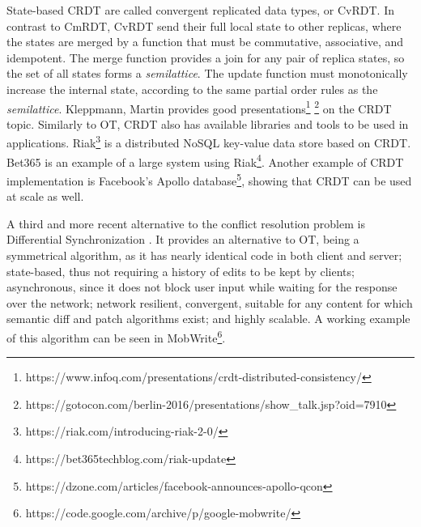 State-based CRDT are called convergent replicated data types, or CvRDT. In contrast to CmRDT, CvRDT send their full local state to other replicas, where the states are merged by a function that must be commutative, associative, and idempotent. The merge function provides a join for any pair of replica states, so the set of all states forms a \textit{semilattice}. The update function must monotonically increase the internal state, according to the same partial order rules as the \textit{semilattice}. Kleppmann, Martin provides good presentations\footnote{https://www.infoq.com/presentations/crdt-distributed-consistency/} \footnote{https://gotocon.com/berlin-2016/presentations/show\_talk.jsp?oid=7910} on the CRDT topic. Similarly to OT, CRDT also has available libraries and tools to be used in applications. Riak\footnote{https://riak.com/introducing-riak-2-0/} is a distributed NoSQL key-value data store based on CRDT. Bet365 is an example of a large system using Riak\footnote{https://bet365techblog.com/riak-update}. Another example of CRDT implementation is Facebook's Apollo database\footnote{https://dzone.com/articles/facebook-announces-apollo-qcon}, showing that CRDT can be used at scale as well.

A third and more recent alternative to the conflict resolution problem is Differential Synchronization \cite{Fraser2009} \cite{Fraser-diff-sync-web}. It provides an alternative to OT, being a symmetrical algorithm, as it has nearly identical code in both client and server; state-based, thus not requiring a history of edits to be kept by clients; asynchronous, since it does not block user input while waiting for the response over the network; network resilient, convergent, suitable for any content for which semantic diff and patch algorithms exist; and highly scalable. A working example of this algorithm can be seen in MobWrite\footnote{https://code.google.com/archive/p/google-mobwrite/}.

